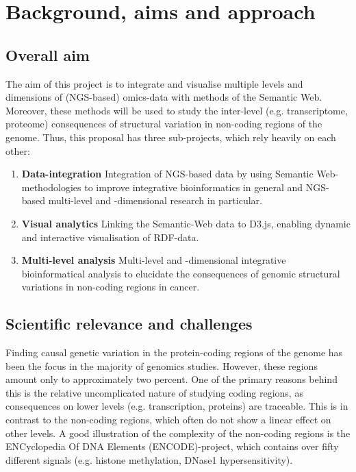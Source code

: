 \documentclass[twoside,fontsize=10pt]{article}
\begin{document}
\newpage
\section*{Background, aims and approach}
\subsection*{Overall aim}
The aim of this project is to integrate and visualise multiple levels and dimensions of (NGS-based) omics-data with methods of the Semantic Web. Moreover, these methods will be used to study the inter-level (e.g. transcriptome, proteome) consequences of structural variation in non-coding regions of the genome. Thus, this proposal has three sub-projects, which rely heavily on each other:

\begin{enumerate}
\item \textbf{Data-integration} 
Integration of NGS-based data by using Semantic Web-methodologies to improve integrative bioinformatics in general and NGS-based multi-level and -dimensional research in particular.
\item \textbf{Visual analytics} 
Linking the Semantic-Web data to D3.js, enabling dynamic and interactive visualisation of RDF-data.
\item \textbf{Multi-level analysis} 
Multi-level and -dimensional integrative bioinformatical analysis to elucidate the consequences of genomic structural variations in non-coding regions in cancer.
\end{enumerate}
\subsection*{Scientific relevance and challenges} 
Finding causal genetic variation in the protein-coding regions of the genome has been the focus in the majority of genomics studies. However, these regions amount only to approximately two percent\cite{Lander2001}. One of the primary reasons behind this is the relative uncomplicated nature of studying coding regions, as consequences on lower levels (e.g. transcription, proteins) are traceable\cite{McLaren2010}. This is in contrast to the non-coding regions, which often do not show a linear effect on other levels\cite{Bird2006}. A good illustration of the complexity of the non-coding regions is the ENCyclopedia Of DNA Elements (ENCODE)-project\cite{ENCODE}, which contains over fifty different signals (e.g. histone methylation, DNase1 hypersensitivity). 
\end{document}
